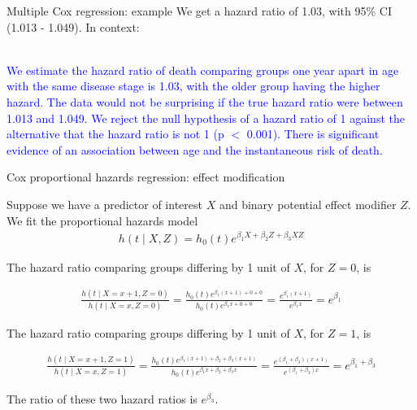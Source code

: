 \documentclass[10pt,t]{beamer}
\begin{document}
\begin{frame}{Multiple Cox regression: example}
		We get a hazard ratio of 1.03, with 95\% CI (1.013 - 1.049). In context:
	\\ ~\ 
	
		\textcolor{blue}{We estimate the hazard ratio of death comparing groups one year apart in age with the same disease stage is 1.03, with the older group having the higher hazard. The data would not be surprising if the true hazard ratio were between 1.013 and 1.049. We reject the null hypothesis of a hazard ratio of 1 against the alternative that the hazard ratio is not 1 (p $<$ 0.001). There is significant evidence of an association between age and the instantaneous risk of death.}
\end{frame}

\begin{frame}{Cox proportional hazards regression: effect modification}
	
	\vspace{-5 mm}
	
	Suppose we have a predictor of interest $X$ and binary potential effect modifier $Z$. We fit the proportional hazards model
	\begin{align*}
		h(t \mid X, Z) = h_0(t)e^{\beta_1X + \beta_2Z + \beta_3XZ}
	\end{align*}  
	
	\smallskip
	
	The hazard ratio comparing groups differing by 1 unit of $X$, for $Z = 0$, is
	\begin{small}
	\begin{align*}
		\frac{h(t \mid X = x+ 1, Z = 0)}{h(t \mid X = x, Z = 0)} = \frac{h_0(t)e^{\beta_1 (x + 1) + 0 + 0}}{h_0(t)e^{\beta_1x + 0 + 0}} = \frac{e^{\beta_1(x + 1)}}{e^{\beta_1 x}} = e^{\beta_1}
	\end{align*}
	\end{small} 

\smallskip
 
	The hazard ratio comparing groups differing by 1 unit of $X$, for $Z = 1$, is
	\begin{small}
		
	\begin{align*}
		\frac{h(t \mid X = x+ 1, Z = 1)}{h(t \mid X = x, Z = 1)} = \frac{h_0(t)e^{\beta_1 (x + 1) + \beta_2 + \beta_3(x + 1)}}{h_0(t)e^{\beta_1x + \beta_2 + \beta_3x}} = \frac{e^{(\beta_1 + \beta_3)(x + 1) }}{e^{(\beta_1  + \beta_3)x}} = e^{\beta_1 + \beta_3}
	\end{align*}
	\end{small}  

\smallskip
	The ratio of these two hazard ratios is $e^{\beta_3}$. 
\end{frame}
\end{document}
